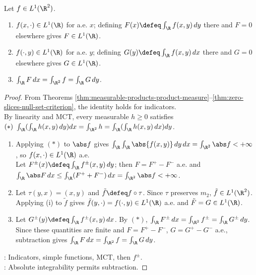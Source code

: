 \begin{theorem} \label{thm:fubini-absolutely-integrable-functions} \\
Let $f\in L^1(\R^2)$.
\begin{enumerate}[label=(\roman*)]
\setlength{\itemsep}{0pt}
\item $f(x,\cdot)\in L^1(\R)$ for a.e. $x$; defining $F(x)\defeq\int_{\R}f(x,y)\,dy$ there and $F=0$ elsewhere gives $F\in L^1(\R)$.
\item $f(\cdot,y)\in L^1(\R)$ for a.e. $y$; defining $G(y)\defeq\int_{\R}f(x,y)\,dx$ there and $G=0$ elsewhere gives $G\in L^1(\R)$.
\item $\int_{\R}F\,dx=\int_{\R^2}f=\int_{\R}G\,dy$.
\end{enumerate}
\begin{proof}
From Theorems \ref{thm:measurable-products-product-measure}--\ref{thm:zero-slices-null-set-criterion}, the identity holds for indicators.\\
By linearity and MCT, every measurable $h\geq0$ satisfies $(*)\ \int_{\R}(\int_{\R}h(x,y)\,dy)dx=\int_{\R^2}h=\int_{\R}(\int_{\R}h(x,y)\,dx)dy$.
\begin{enumerate}[label=(\roman*)]
\setlength{\itemsep}{0pt}
\item Applying $(*)$ to $\abs f$ gives $\int_{\R}\int_{\R}\abs{f(x,y)}\,dy\,dx=\int_{\R^2}\abs f<+\infty$, so $f(x,\cdot)\in L^1(\R)$ a.e.\\
Let $F^\pm(x)\defeq\int_{\R}f^\pm(x,y)\,dy$; then $F=F^+-F^-$ a.e. and $\int_{\R}\abs F\,dx\leq\int_{\R}(F^++F^-)\,dx=\int_{\R^2}\abs f<+\infty$.
\item Let $\tau(y,x)=(x,y)$ and $\tilde f\defeq f\circ\tau$. Since $\tau$ preserves $m_2$, $\tilde f\in L^1(\R^2)$.\\
Applying (i) to $\tilde f$ gives $\tilde f(y,\cdot)=f(\cdot,y)\in L^1(\R)$ a.e. and $\tilde F=G\in L^1(\R)$.
\item Let $G^\pm(y)\defeq\int_{\R}f^\pm(x,y)\,dx$. By $(*)$, $\int_{\R}F^\pm\,dx=\int_{\R^2}f^\pm=\int_{\R}G^\pm\,dy$. Since these quantities are finite and $F=F^+-F^-$, $G=G^+-G^-$ a.e., subtraction gives $\int_{\R}F\,dx=\int_{\R^2}f=\int_{\R}G\,dy$.
\end{enumerate}
: Indicators, simple functions, MCT, then $f^\pm$.\\
: Absolute integrability permits subtraction.
\end{proof}
\end{theorem}
